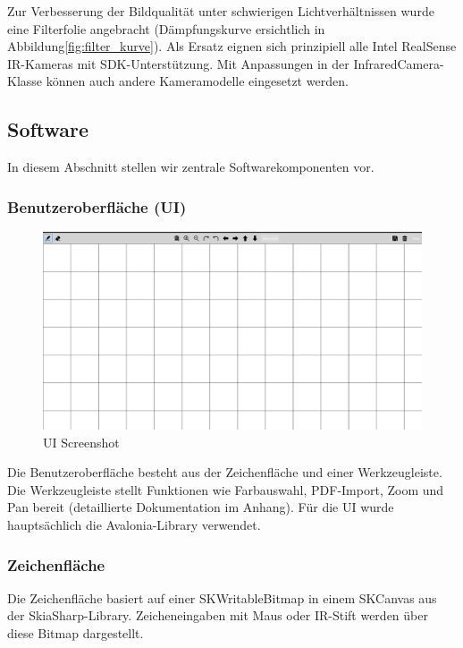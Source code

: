 Zur Verbesserung der Bildqualität unter schwierigen Lichtverhältnissen wurde eine Filterfolie angebracht (Dämpfungskurve ersichtlich in Abbildung\ref{fig:filter_kurve}). Als Ersatz eignen sich prinzipiell alle Intel RealSense IR-Kameras mit SDK-Unterstützung. Mit Anpassungen in der InfraredCamera-Klasse können auch andere Kameramodelle eingesetzt werden.

\clearpage

\subsection{Software}
In diesem Abschnitt stellen wir zentrale Softwarekomponenten vor.

\vspace{0.5em}
\subsubsection{Benutzeroberfläche (UI)}
\begin{figure}[H]
    \centering
    \includegraphics[width=0.75\linewidth]{graphics/ui_screenshot.png}
    \caption{UI Screenshot}
    \label{fig:UI_screenshot}
\end{figure}

Die Benutzeroberfläche besteht aus der Zeichenfläche und einer Werkzeugleiste.\\
Die Werkzeugleiste stellt Funktionen wie Farbauswahl, PDF-Import, Zoom und Pan bereit (detaillierte Dokumentation im Anhang). Für die UI wurde hauptsächlich die Avalonia-Library verwendet.

\vspace{0.5em}
\subsubsection{Zeichenfläche}

Die Zeichenfläche basiert auf einer SKWritableBitmap in einem SKCanvas aus der SkiaSharp-Library. Zeicheneingaben mit Maus oder IR-Stift werden über diese Bitmap dargestellt.

